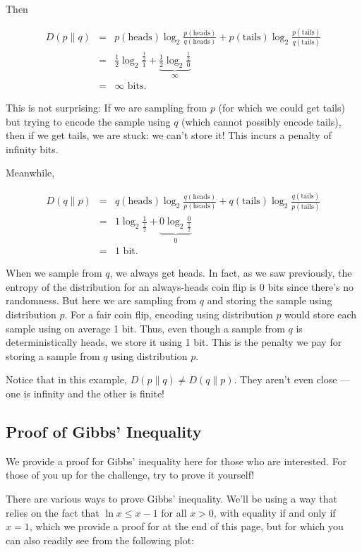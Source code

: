 \documentclass[6008notes.tex]{subfiles}
\begin{document}
Then

\begin{eqnarray*}
D(p \parallel q)
&=&
  p(\text{heads}) \log_2 \frac{p(\text{heads})}{q(\text{heads})}
+ p(\text{tails}) \log_2 \frac{p(\text{tails})}{q(\text{tails})} \\
&=&
  \frac12\log_2 \frac{\frac12}1
+ \underbrace{\frac12\log_2 \frac{\frac12}0}_{\infty} \\
&=&
  \infty\text{ bits}.
\end{eqnarray*}

This is not surprising: If we are sampling from $p$ (for which we could get tails) but trying to encode the sample using $q$ (which cannot possibly encode tails), then if we get tails, we are stuck: we can't store it! This incurs a penalty of infinity bits.

Meanwhile,

\begin{eqnarray*}
D(q \parallel p)
&=&
  q(\text{heads}) \log_2 \frac{q(\text{heads})}{p(\text{heads})}
+ q(\text{tails}) \log_2 \frac{q(\text{tails})}{p(\text{tails})} \\
&=&
  1 \log_2 \frac1{\frac12}
+ \underbrace{0 \log_2 \frac0{\frac12}}_0 \\
&=&
  1\text{ bit}.
\end{eqnarray*}

When we sample from $q$, we always get heads. In fact, as we saw previously, the entropy of the distribution for an always-heads coin flip is 0 bits since there's no randomness. But here we are sampling from $q$ and storing the sample using distribution $p$. For a fair coin flip, encoding using distribution $p$ would store each sample using on average 1 bit. Thus, even though a sample from $q$ is deterministically heads, we store it using 1 bit. This is the penalty we pay for storing a sample from $q$ using distribution $p$.

Notice that in this example, $D(p \parallel q) \ne D(q \parallel p)$. They aren't even close --- one is infinity and the other is finite!

\subsection{Proof of Gibbs' Inequality}

We provide a proof for Gibbs' inequality here for those who are interested. For those of you up for the challenge, try to prove it yourself!

There are various ways to prove Gibbs' inequality. We'll be using a way that relies on the fact that $\ln x\le x-1$ for all $x>0$, with equality if and only if $x=1$, which we provide a proof for at the end of this page, but for which you can also readily see from the following plot:
\end{document}
